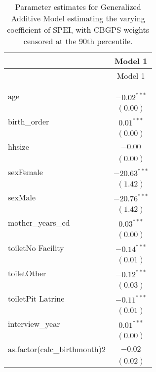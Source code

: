 
\begin{longtable}{l c}
\hline
 & Model 1 \\
\hline
\endfirsthead
\hline
 & Model 1 \\
\hline
\endhead
\hline
\endfoot
\hline
\multicolumn{2}{l}{\scriptsize{$^{***}p<0.001$; $^{**}p<0.01$; $^{*}p<0.05$}}\\
\caption{Parameter estimates for Generalized Additive Model estimating the varying coefficient of SPEI, with CBGPS weights censored at the 90th percentile.}
\label{table:coefficients}
\endlastfoot \\
age                              & $-0.02^{***}$  \\
                                 & $(0.00)$       \\
birth\_order                     & $0.01^{***}$   \\
                                 & $(0.00)$       \\
hhsize                           & $-0.00$        \\
                                 & $(0.00)$       \\
sexFemale                        & $-20.63^{***}$ \\
                                 & $(1.42)$       \\
sexMale                          & $-20.76^{***}$ \\
                                 & $(1.42)$       \\
mother\_years\_ed                & $0.03^{***}$   \\
                                 & $(0.00)$       \\
toiletNo Facility                & $-0.14^{***}$  \\
                                 & $(0.01)$       \\
toiletOther                      & $-0.12^{***}$  \\
                                 & $(0.03)$       \\
toiletPit Latrine                & $-0.11^{***}$  \\
                                 & $(0.01)$       \\
interview\_year                  & $0.01^{***}$   \\
                                 & $(0.00)$       \\
as.factor(calc\_birthmonth)2     & $-0.02$        \\
                                 & $(0.02)$       \\

\end{longtable}

